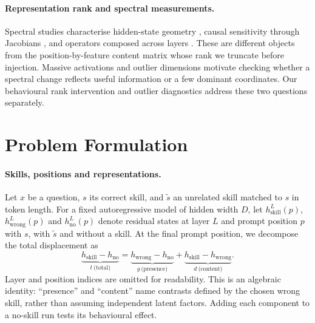 \documentclass{article}
\newcommand{\dvec}{\ensuremath{d}}
\newcommand{\gvec}{\ensuremath{g}}
\newcommand{\tvec}{\ensuremath{t}}
\begin{document}
\paragraph{Representation rank and spectral measurements.}
Spectral studies characterise hidden-state geometry
\citep{valeriani2023geometry}, causal sensitivity through Jacobians
\citep{sarkar2026causaldim}, and operators composed across layers
\citep{fernando2026residualspectral}. These are different objects from the
position-by-feature content matrix whose rank we truncate before injection.
Massive activations \citep{sun2024massive, shi2026melayer} and outlier dimensions
\citep{timkey2021rogue, kovaleva2021bertbusters} motivate checking whether a
spectral change reflects useful information or a few dominant coordinates.
Our behavioural rank intervention and outlier diagnostics address these two
questions separately.

\section{Problem Formulation}
\label{sec:formulation}

\paragraph{Skills, positions and representations.}
Let $x$ be a question, $s$ its correct skill, and $\tilde{s}$ an unrelated skill
matched to $s$ in token length. For a fixed autoregressive model of hidden width
$D$, let $h^L_{\mathrm{skill}}(p)$, $h^L_{\mathrm{wrong}}(p)$ and
$h^L_{\mathrm{no}}(p)$ denote residual states at layer $L$ and prompt position
$p$ with $s$, with $\tilde{s}$ and without a skill. At the final prompt position,
we decompose the total displacement as
\begin{equation}
\underbrace{h_{\mathrm{skill}}-h_{\mathrm{no}}}_{\tvec\ \text{(total)}}
=
\underbrace{h_{\mathrm{wrong}}-h_{\mathrm{no}}}_{\gvec\ \text{(presence)}}
+
\underbrace{h_{\mathrm{skill}}-h_{\mathrm{wrong}}}_{\dvec\ \text{(content)}}.
\label{eq:decomp}
\end{equation}
Layer and position indices are omitted for readability. This is an algebraic
identity: ``presence'' and ``content'' name contrasts defined by the chosen
wrong skill, rather than assuming independent latent factors. Adding each
component to a no-skill run tests its behavioural effect.
\end{document}
